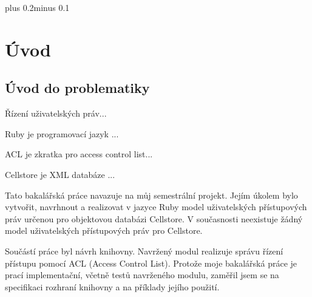 \documentclass[11pt,twoside,a4paper]{book}
\begin{document}
\listoffigures



\listoftables



\mainbodystarts
\normalfont
{}\baselineskip plus 0.2\baselineskip minus 0.1\baselineskip



% 
% 


\chapter{Úvod}

\section{Úvod do problematiky}
Řízení uživatelských práv...

Ruby je programovací jazyk ...

ACL je zkratka pro access control list...

Cellstore je XML databáze ...


Tato bakalářská práce navazuje na můj semestrální projekt. Jejím úkolem bylo vytvořit, navrhnout a realizovat v jazyce Ruby model uživatelských přístupových práv určenou pro objektovou databázi Cellstore. V současnosti neexistuje žádný model uživatelských přístupových práv pro Cellstore. 

Součástí práce byl návrh knihovny. Navržený modul realizuje správu řízení přístupu pomocí ACL (Access Control List). Protože moje bakalářská práce je prací implementační, včetně testů navrženého modulu, zaměřil jsem se na specifikaci rozhraní knihovny a na příklady jejího použití.
\end{document}
